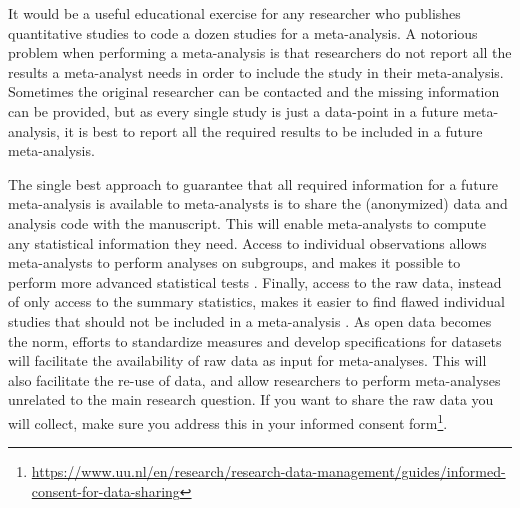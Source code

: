 \documentclass[
  oneside]{krantz}
\renewcommand{\href}[2]{#2\footnote{\url{#1}}}
\begin{document}
It would be a useful educational exercise for any researcher who publishes quantitative studies to code a dozen studies for a meta-analysis. A notorious problem when performing a meta-analysis is that researchers do not report all the results a meta-analyst needs in order to include the study in their meta-analysis. Sometimes the original researcher can be contacted and the missing information can be provided, but as every single study is just a data-point in a future meta-analysis, it is best to report all the required results to be included in a future meta-analysis.

The single best approach to guarantee that all required information for a future meta-analysis is available to meta-analysts is to share the (anonymized) data and analysis code with the manuscript. This will enable meta-analysts to compute any statistical information they need. Access to individual observations allows meta-analysts to perform analyses on subgroups, and makes it possible to perform more advanced statistical tests \citep{stewart_ipd_2002}. Finally, access to the raw data, instead of only access to the summary statistics, makes it easier to find flawed individual studies that should not be included in a meta-analysis \citep{lawrence_lesson_2021}. As open data becomes the norm, efforts to standardize measures and develop specifications for datasets will facilitate the availability of raw data as input for meta-analyses. This will also facilitate the re-use of data, and allow researchers to perform meta-analyses unrelated to the main research question. If you want to share the raw data you will collect, make sure you address this in your \href{https://www.uu.nl/en/research/research-data-management/guides/informed-consent-for-data-sharing}{informed consent form}.
\end{document}
